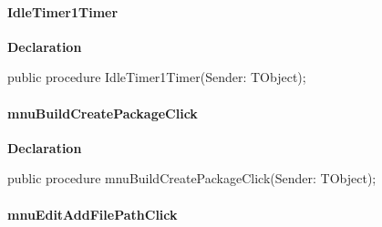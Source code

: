 \documentclass{report}
\newif\ifpdf
\begin{document}
\paragraph*{IdleTimer1Timer}\hspace*{\fill}

\label{editor.TfrmEditor-IdleTimer1Timer}
\begin{list}{}{
\setlength{\itemindent}{0cm}
\setlength{\listparindent}{0cm}
\setlength{\leftmargin}{\evensidemargin}
\addtolength{\leftmargin}{\tmplength}
\settowidth{\labelsep}{X}
\addtolength{\leftmargin}{\labelsep}
\setlength{\labelwidth}{\tmplength}
}
\item[\textbf{Declaration}\hfill]
\ifpdf
\begin{flushleft}
\fi
\begin{ttfamily}
public procedure IdleTimer1Timer(Sender: TObject);\end{ttfamily}

\ifpdf
\end{flushleft}
\fi

\end{list}
\paragraph*{mnuBuildCreatePackageClick}\hspace*{\fill}

\label{editor.TfrmEditor-mnuBuildCreatePackageClick}
\begin{list}{}{
\setlength{\itemindent}{0cm}
\setlength{\listparindent}{0cm}
\setlength{\leftmargin}{\evensidemargin}
\addtolength{\leftmargin}{\tmplength}
\settowidth{\labelsep}{X}
\addtolength{\leftmargin}{\labelsep}
\setlength{\labelwidth}{\tmplength}
}
\item[\textbf{Declaration}\hfill]
\ifpdf
\begin{flushleft}
\fi
\begin{ttfamily}
public procedure mnuBuildCreatePackageClick(Sender: TObject);\end{ttfamily}

\ifpdf
\end{flushleft}
\fi

\end{list}
\paragraph*{mnuEditAddFilePathClick}\hspace*{\fill}
\end{document}
